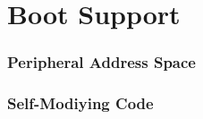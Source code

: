 \section{Boot Support}

\begin{frame}
    \frametitle{Peripheral Address Space}
\end{frame}

\begin{frame}
    \frametitle{Self-Modiying Code}
\end{frame}
